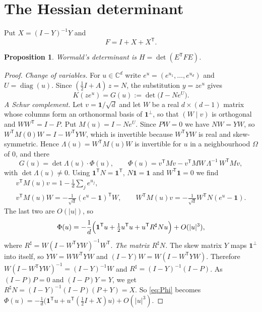 \documentclass[11pt]{amsart}
\newtheorem{proposition}[theorem]{Proposition}
\theoremstyle{remark}
\numberwithin{equation}{section}
\newcommand{\one}{\mathbf{1}}
\newcommand{\T}{\mathsf{T}}
\begin{document}
\section{The Hessian determinant}\label{sec:hessian}

Put $X=(I-Y)^{-1}Y$ and
\begin{equation}\label{eq:F}
F=I+X+X^\T.
\end{equation}

\begin{proposition}\label{prop:hessian}
Wormald's determinant is $H=\det(E^\T FE)$.
\end{proposition}

\begin{proof}
\emph{Change of variables.} For $u\in\mathbb C^d$ write $e^u=(e^{u_1},\dots,e^{u_d})$ and $U=\operatorname{diag}(u)$. Since $(\tfrac12I+A)\,z=N$, the substitution $y=ze^u$ gives
\[
K(ze^{u})=G(u):=\det\bigl(I-Ne^{U}\bigr).
\]
\emph{A Schur complement.} Let $v=\one/\sqrt d$ and let $W$ be a real $d\times(d-1)$ matrix whose columns form an orthonormal basis of $\one^\perp$, so that $(W\mid v)$ is orthogonal and $WW^\T=I-P$. Put $M(u)=I-Ne^U$. Since $PW=0$ we have $NW=YW$, so $W^\T M(0)W=I-W^\T YW$, which is invertible because $W^\T YW$ is real and skew-symmetric. Hence $\Lambda(u)=W^\T M(u)W$ is invertible for $u$ in a neighbourhood $\Omega$ of $0$, and there
\[
G(u)=\det\Lambda(u)\cdot\Phi(u),\qquad \Phi(u)=v^\T Mv-v^\T MW\,\Lambda^{-1}\,W^\T Mv,
\]
with $\det\Lambda(u)\ne0$. Using $\one^\T N=\one^\T$, $N\one=\one$ and $W^\T\one=0$ we find
\begin{gather*}
v^\T M(u)v=1-\tfrac1d\textstyle\sum_je^{u_j},\\
v^\T M(u)W=-\tfrac1{\sqrt d}(e^u-\one)^\T W,\qquad W^\T M(u)v=-\tfrac1{\sqrt d}W^\T N(e^u-\one).
\end{gather*}
The last two are $O(|u|)$, so
\begin{equation}\label{eq:Phi}
\Phi(u)=-\frac1d\Bigl(\one^\T u+\tfrac12u^\T u+u^\T R^\sharp Nu\Bigr)+O(|u|^3),
\end{equation}
where $R^\sharp=W(I-W^\T YW)^{-1}W^\T$.
\emph{The matrix $R^\sharp N$.} The skew matrix $Y$ maps $\one^\perp$ into itself, so $YW=WW^\T YW$ and $(I-Y)W=W(I-W^\T YW)$. Therefore $W(I-W^\T YW)^{-1}=(I-Y)^{-1}W$ and $R^\sharp=(I-Y)^{-1}(I-P)$. As $(I-P)P=0$ and $(I-P)Y=Y$, we get $R^\sharp N=(I-Y)^{-1}(I-P)(P+Y)=X$. So \eqref{eq:Phi} becomes $\Phi(u)=-\frac1d\bigl(\one^\T u+u^\T(\tfrac12I+X)u\bigr)+O(|u|^3)$.


\end{proof}
\end{document}
